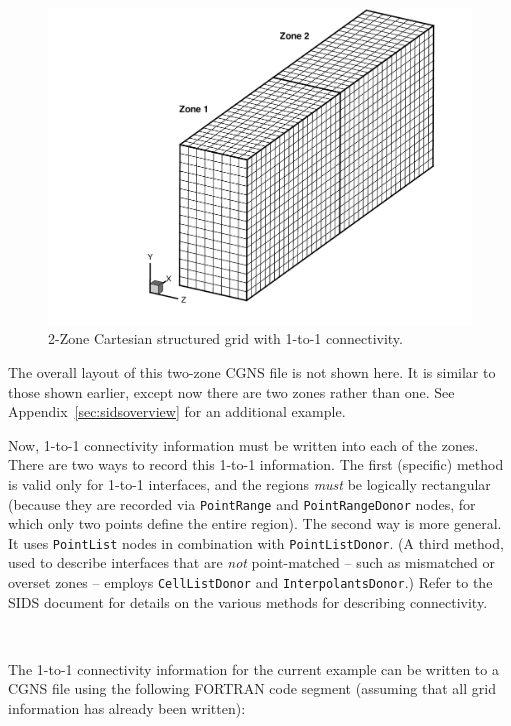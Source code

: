 \documentclass[12pt]{article}
\begin{document}
\begin{figure}[hpbt]
\centerline{{\includegraphics[width=120mm]{figures/grid_cartesian2}}}
\caption{2-Zone Cartesian structured grid with 1-to-1 connectivity.}
\label{FIGgrid_cartesian2}
\end{figure}
%

The overall layout of this two-zone CGNS file is not shown here.
It is similar to those shown earlier, except now there are two
zones rather than one.  See Appendix~\ref{sec:sidsoverview} for an additional example.

Now, 1-to-1 connectivity information must be written into
each of the zones.  There are two ways to record this 1-to-1
information.
The first (specific)
method is valid only for 1-to-1 interfaces, and the regions
{\it must} be logically rectangular (because they are recorded
via {\tt PointRange} and {\tt PointRangeDonor}
nodes, for which only two points define
the entire region). 
The second way is more general.  It uses 
{\tt PointList} nodes in combination with {\tt PointListDonor}.
(A third method, used to describe interfaces that are
{\it not} point-matched -- such as mismatched or overset zones --
employs {\tt CellListDonor} and {\tt InterpolantsDonor}.)
Refer to the SIDS document \cite{ALLMARAS}
for details on the various methods for describing connectivity.

~

\noindent{}

The 1-to-1 connectivity information for the current example
can be written to a CGNS file using the following
FORTRAN code segment (assuming that all grid information has
already been written):
\end{document}
